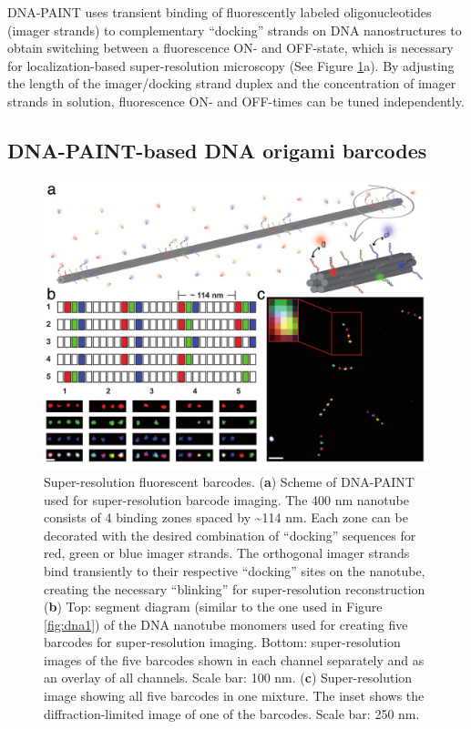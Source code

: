 DNA-PAINT uses transient binding of fluorescently labeled oligonucleotides 
(imager strands) to complementary “docking” strands on DNA nanostructures to obtain 
switching between a fluorescence ON- and OFF-state, which is necessary for 
localization-based super-resolution microscopy (See Figure \ref{fig:dna4}a). By adjusting the length of 
the imager/docking strand duplex and the concentration of imager strands in solution, 
fluorescence ON- and OFF-times can be tuned independently.

\subsection{DNA-PAINT-based DNA origami barcodes}
\begin{figure} %
\includegraphics[width=\textwidth]{figures/dna4}
\caption[Super-resolution fluorescent barcodes.]{Super-resolution fluorescent barcodes.
 (\textbf{a}) Scheme of DNA-PAINT used for 
super-resolution barcode imaging. The 400 nm nanotube consists of 4 binding zones 
spaced by \textasciitilde114 nm. Each zone can be decorated with the desired combination of 
“docking” sequences for red, green or blue imager strands. The orthogonal imager strands 
bind transiently to their respective “docking” sites on the nanotube, creating the 
necessary “blinking” for super-resolution reconstruction (\textbf{b}) Top: segment diagram 
(similar to the one used in Figure \ref{fig:dna1}) of the DNA nanotube monomers used for creating 
five barcodes for super-resolution imaging. Bottom: super-resolution images of the five 
barcodes shown in each channel separately and as an overlay of all channels. Scale bar: 
100 nm. (\textbf{c}) Super-resolution image showing all five barcodes in one mixture. The inset 
shows the diffraction-limited image of one of the barcodes. Scale bar: 250 nm.
\label{fig:dna4}}
\end{figure}


